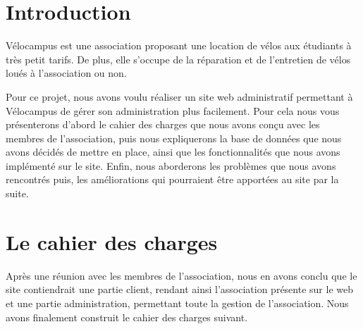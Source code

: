 \documentclass[11pt,a4paper,titlepage]{report}
\begin{document}
\tableofcontents
\chapter*{Introduction}
Vélocampus est une association proposant une location de vélos aux étudiants à très petit tarifs. De plus, elle s'occupe de la réparation et de l'entretien de vélos loués à l'association ou non.

Pour ce projet, nous avons voulu réaliser un site web administratif permettant à Vélocampus de gérer son administration plus facilement. Pour cela nous vous présenterons d'abord le cahier des charges que nous avons conçu avec les membres de l'association, puis nous expliquerons la base de données que nous avons décidés de mettre en place, ainsi que les fonctionnalités que nous avons implémenté sur le site. Enfin, nous aborderons les problèmes que nous avons rencontrés puis, les améliorations qui pourraient être apportées au site par la suite.


\chapter{Le cahier des charges}
Après une réunion avec les membres de l'association, nous en avons conclu que le site contiendrait une partie client, rendant ainsi l'association présente sur le web et une partie administration, permettant toute la gestion de l'association. 
Nous avons finalement construit le cahier des charges suivant.\\
\end{document}
